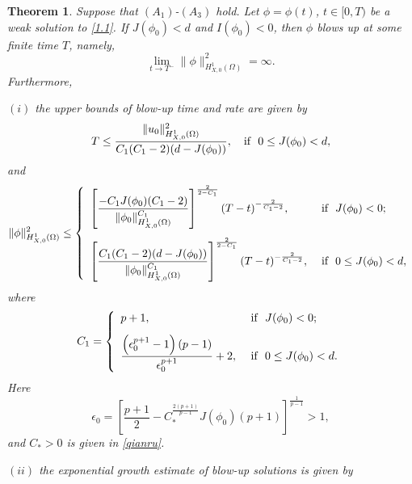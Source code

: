 \documentclass[11pt,a4paper]{article}
\numberwithin{equation}{section}
\newtheorem{thm}{Theorem}[section]
\newcommand{\ds}{\displaystyle}
\numberwithin{remark}{section}
\begin{document}
\begin{thm}\label{baopo}
Suppose that $(A_1)$-$(A_3)$ hold. Let $\phi=\phi(t)$, $t\in[0,T)$ be a weak solution to \eqref{1.1}. If $J(\phi_0)<d$ and $I(\phi_0)<0$, then $\phi$ blows up at some finite time $T$, namely,
\begin{equation*}
\lim_{t\rightarrow T^-}\|\phi\|_{H_{X,0}^1(\Omega)}^2=\infty.
\end{equation*}
Furthermore,
\begin{description}
  \item{$(i)$} the upper bounds of blow-up time and rate are given by
  \begin{equation}\label{ut}
  T\leq\frac{\|u_0\|_{H_{X,0}^1(\Omega)}^2}{C_1(C_1-2)(d-J(\phi_0))},\hbox{~~~if~~}0\leq J(\phi_0)<d,
  \end{equation}
  and
  \begin{equation}\label{ur}
  \|\phi\|_{H_{X,0}^1(\Omega)}^2\leq\left\{
               \begin{array}{ll}
               \ds  \left[\frac{-C_1J(\phi_0)(C_1-2)}{\|\phi_0\|_{H_{X,0}^1(\Omega)}^{C_1}}\right]^{\frac{2}{2-C_1}}(T-t)^{-\frac{2}{C_1-2}},&\hbox{~if~~}J(\phi_0)<0; \\
               \vspace{-0.05in}\\
               \ds  \left[\frac{C_1(C_1-2)(d-J(\phi_0))}{\|\phi_0\|_{H_{X,0}^1(\Omega)}^{C_1}}\right]^{\frac{2}{2-C_1}}(T-t)^{-\frac{2}{C_1-2}},&\hbox{~if~~}0\leq J(\phi_0)<d,
               \end{array}
             \right.
  \end{equation}
  where
  \begin{equation}\label{C1}
  C_1=\left\{
               \begin{array}{ll}
               \ds  p+1,&\hbox{ if~~}J(\phi_0)<0; \\
               \vspace{-0.05in}\\
               \ds  \frac{\left(\epsilon_0^{p+1}-1\right)(p-1)}{\epsilon_0^{p+1}}+2,&\hbox{ if~~}0\leq J(\phi_0)<d.
               \end{array}
             \right.
  \end{equation}
  Here
  \begin{equation}\label{68}
  \epsilon_0=\left[\frac{p+1}{2}-C_*^{\frac{2(p+1)}{p-1}}J(\phi_0)(p+1)\right]^{\frac{1}{p-1}}>1,
  \end{equation}
  and $C_*>0$ is given in \eqref{qianru}.
  \item{$(ii)$} the exponential growth estimate of blow-up solutions is given by

\end{description}
\end{thm}
\end{document}
